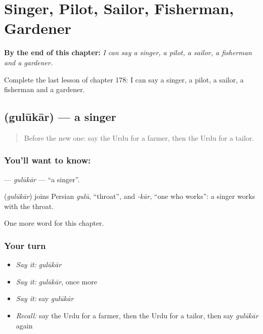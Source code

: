 
\chapter{Singer, Pilot, Sailor, Fisherman, Gardener}
\label{ch:ur-singer-pilot-sailor-fisherman-gardener}

\begin{chapteropening}
\textbf{By the end of this chapter:} \emph{I can say a singer, a pilot, a sailor, a fisherman and a gardener.}

Complete the last lesson of chapter 178: I can say a singer, a pilot, a sailor, a fisherman and a gardener.
\end{chapteropening}

\section[\texorpdfstring{\ur{گلوکار} (gulūkār)}{گلوکار (gulūkār)}]{ (gulūkār) — a singer}

\label{lesson:UR-C178-gulukar}



\begin{quote}
Before the new one: say the Urdu for a farmer, then the Urdu for a tailor.
\end{quote}

\subsection*{You'll want to know: }
\textbf{} — \emph{gulūkār} — \textquotedblleft{}a singer\textquotedblright{}.

\begin{cousinweb}
\textbf{} (\emph{gulūkār}) joins Persian \emph{gulū}, \textquotedblleft{}throat\textquotedblright{}, and \emph{-kār}, \textquotedblleft{}one who works\textquotedblright{}: a singer works with the throat.
\end{cousinweb}

\begin{grammarlens}[title={What you've built}]
One more word for this chapter.
\end{grammarlens}

\subsection*{Your turn}
\begin{itemize}
\raggedright
  \item \emph{Say it:} \emph{gulūkār}
  \item \emph{Say it:} \emph{gulūkār}, once more
  \item \emph{Say it:} say \emph{gulūkār}
  \item \emph{Recall:} say the Urdu for a farmer, then the Urdu for a tailor, then say \emph{gulūkār} again
\end{itemize}

